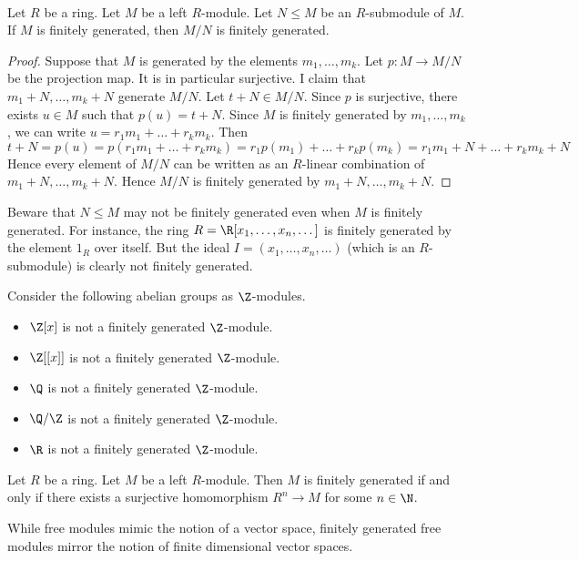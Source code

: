 \documentclass[a4paper]{article}
\begin{document}
\begin{prp}{}{}\\
Let $R$ be a ring. Let $M$ be a left $R$-module. Let $N\leq M$ be an $R$-submodule of $M$. If $M$ is finitely generated, then $M/N$ is finitely generated. 
\begin{proof}
Suppose that $M$ is generated by the elements $m_1,\dots,m_k$. Let $p:M\to M/N$ be the projection map. It is in particular surjective. I claim that $m_1+N,\dots,m_k+N$ generate $M/N$. Let $t+N\in M/N$. Since $p$ is surjective, there exists $u\in M$ such that $p(u)=t+N$. Since $M$ is finitely generated by $m_1,\dots,m_k$, we can write $u=r_1m_1+\dots+r_km_k$. Then $$t+N=p(u)=p(r_1m_1+\dots+r_km_k)=r_1p(m_1)+\dots+r_kp(m_k)=r_1m_1+N+\dots+r_km_k+N$$ Hence every element of $M/N$ can be written as an $R$-linear combination of $m_1+N,\dots,m_k+N$. Hence $M/N$ is finitely generated by $m_1+N,\dots,m_k+N$. 
\end{proof}
\end{prp}

Beware that $N\leq M$ may not be finitely generated even when $M$ is finitely generated. For instance, the ring $R=\R[x_1,\dots,x_n,\dots]$ is finitely generated by the element $1_R$ over itself. But the ideal $I=(x_1,\dots,x_n,\dots)$ (which is an $R$-submodule) is clearly not finitely generated. 

\begin{eg}{}{} Consider the following abelian groups as $\Z$-modules. 
\begin{itemize}
\item $\Z[x]$ is not a finitely generated $\Z$-module. 
\item $\Z[[x]]$ is not a finitely generated $\Z$-module. 
\item $\Q$ is not a finitely generated $\Z$-module. 
\item $\Q/\Z$ is not a finitely generated $\Z$-module. 
\item $\R$ is not a finitely generated $\Z$-module. 
\end{itemize}
\end{eg}

\begin{prp}{}{} Let $R$ be a ring. Let $M$ be a left $R$-module. Then $M$ is finitely generated if and only if there exists a surjective homomorphism $R^n\to M$ for some $n\in\N$. 
\end{prp}

While free modules mimic the notion of a vector space, finitely generated free modules mirror the notion of finite dimensional vector spaces. 
\end{document}
